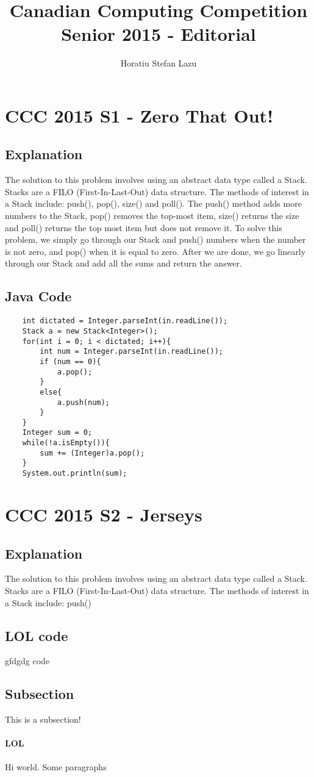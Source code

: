 \documentclass[52pt]{article}
\title{Canadian Computing Competition Senior 2015 - Editorial}
\author{Horatiu Stefan Lazu}
\begin{document}
	\maketitle
	\newpage
	
	
	\section {CCC 2015 S1 - Zero That Out!}
	\subsection {Explanation}
	
	The solution to this problem involves using an abstract data type called a Stack. Stacks are a FILO (First-In-Last-Out) data structure. The methods of interest in a Stack include: push(), pop(), size() and poll(). The push() method adds more numbers to the Stack, pop() removes the top-most item, size() returns the size and poll() returns the top most item but does not remove it. To solve this problem, we simply go through our Stack and push() numbers when the number is not zero, and pop() when it is equal to zero. After we are done, we go linearly through our Stack and add all the sums and return the answer.
	\subsection {Java Code}
	\begin{lstlisting}
	int dictated = Integer.parseInt(in.readLine());
	Stack a = new Stack<Integer>();
	for(int i = 0; i < dictated; i++){
		int num = Integer.parseInt(in.readLine());
		if (num == 0){
			a.pop();	
		}
		else{
			a.push(num);	
		}
	}
	Integer sum = 0;
	while(!a.isEmpty()){
		sum += (Integer)a.pop();
	}
	System.out.println(sum);
	\end{lstlisting}
	\newpage
	
	\section {CCC 2015 S2 - Jerseys}
	\subsection {Explanation}
	The solution to this problem involves using an abstract data type called a Stack. Stacks are a FILO (First-In-Last-Out) data structure. The methods of interest in a Stack include: push() 
	
	\subsection {LOL code}
	gfdgdg code	
	\subsection{Subsection} %
	This is a subsection!
	
	\paragraph{LOL}
	Hi world. Some paragraphs
\end{document}
